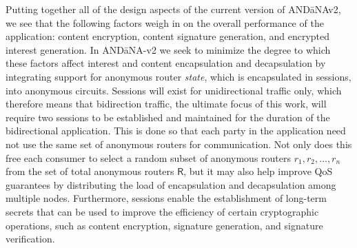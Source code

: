 Putting together all of the design aspects of the current version of {\sf AND\=aNAv2}, we see that the following factors weigh in on the overall performance of the application: content encryption, content signature generation, and encrypted interest generation. In {\sf AND\=aNA-v2} we seek to minimize the degree to which these factors affect interest and content encapsulation and decapsulation by integrating support for anonymous router \emph{state}, which is encapsulated in sessions, into anonymous circuits. Sessions will exist for unidirectional traffic only, which therefore means that bidirection traffic, the ultimate focus of this work, will require two sessions to be established and maintained for the duration of the bidirectional application. This is done so that each party in the application need not use the same set of anonymous routers for communication. Not only does this free each consumer to select a random subset of anonymous routers $r_1,r_2,\dots,r_n$ from the set of total anonymous routers $\mathsf{R}$, but it may also help improve QoS guarantees by distributing the load of encapsulation and decapsulation among multiple nodes. Furthermore, sessions enable the establishment of long-term secrets that can be used to improve the efficiency of certain cryptographic operations, such as content encryption, signature generation, and signature verification. 

